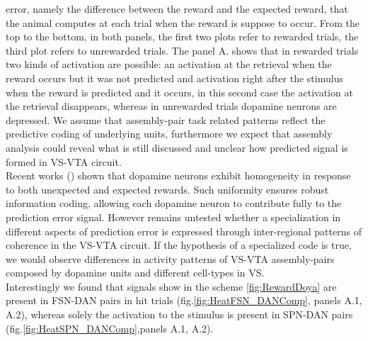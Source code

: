 error, namely the difference between the reward and the expected reward, that the animal computes at each trial when the reward is suppose to occur. From the top to the bottom, in both panels, the first two plots refer to rewarded trials, the third plot refers to unrewarded trials. The panel A. shows that in rewarded trials two kinds of activation are possible: an activation at the retrieval when the reward occurs but it was not predicted and activation right after the stimulus when the reward is predicted and it occurs, in this second case the activation at the retrieval disappears, whereas in unrewarded trials dopamine neurons are depressed. We assume that assembly-pair task related patterns reflect the predictive coding of underlying units, furthermore we expect that assembly analysis could reveal what is still discussed and unclear how predicted signal is formed in VS-VTA circuit.\\Recent works (\cite{UchidaDop}) shown that dopamine neurons exhibit homogeneity in response to both unexpected and expected rewards. Such uniformity ensures robust information coding, allowing each dopamine neuron to contribute fully to the prediction error signal. However remains untested whether a specialization in different aspects of prediction error is expressed through inter-regional patterns of coherence in the VS-VTA circuit. If the hypothesis of a specialized code is true, we would observe differences in activity patterns of VS-VTA assembly-pairs composed by dopamine units and different cell-types in VS.\\Interestingly we found that signals show in the scheme \ref{fig:RewardDoya} are present in FSN-DAN pairs in hit trials (fig.\ref{fig:HeatFSN_DANComp}, panels A.1, A.2), whereas solely the activation to the stimulus is present in SPN-DAN pairs (fig.\ref{fig:HeatSPN_DANComp},panels A.1, A.2).\\
